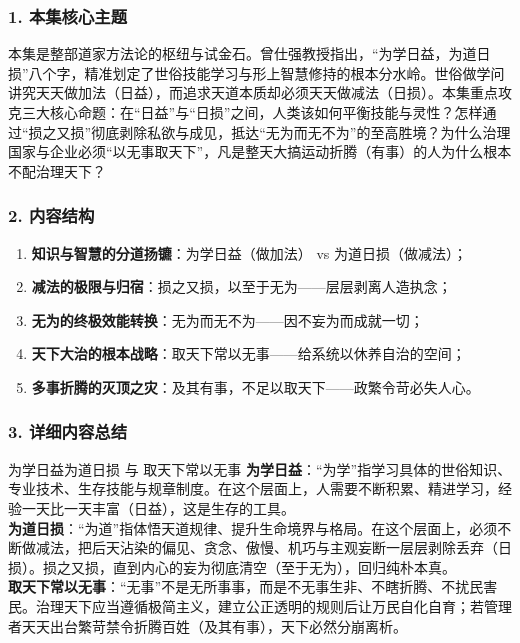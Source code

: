\subsubsection{1. 本集核心主题}
本集是整部道家方法论的枢纽与试金石。曾仕强教授指出，“为学日益，为道日损”八个字，精准划定了世俗技能学习与形上智慧修持的根本分水岭。世俗做学问讲究天天做加法（日益），而追求天道本质却必须天天做减法（日损）。本集重点攻克三大核心命题：在“日益”与“日损”之间，人类该如何平衡技能与灵性？怎样通过“损之又损”彻底剥除私欲与成见，抵达“无为而无不为”的至高胜境？为什么治理国家与企业必须“以无事取天下”，凡是整天大搞运动折腾（有事）的人为什么根本不配治理天下？

\subsubsection{2. 内容结构}
\begin{enumerate}
    \item \textbf{知识与智慧的分道扬镳}：为学日益（做加法） vs 为道日损（做减法）；
    \item \textbf{减法的极限与归宿}：损之又损，以至于无为——层层剥离人造执念；
    \item \textbf{无为的终极效能转换}：无为而无不为——因不妄为而成就一切；
    \item \textbf{天下大治的根本战略}：取天下常以无事——给系统以休养自治的空间；
    \item \textbf{多事折腾的灭顶之灾}：及其有事，不足以取天下——政繁令苛必失人心。
\end{enumerate}

\subsubsection{3. 详细内容总结}

\begin{ConceptBox}{为学日益为道日损 与 取天下常以无事}
\textbf{为学日益}：“为学”指学习具体的世俗知识、专业技术、生存技能与规章制度。在这个层面上，人需要不断积累、精进学习，经验一天比一天丰富（日益），这是生存的工具。\\
\textbf{为道日损}：“为道”指体悟天道规律、提升生命境界与格局。在这个层面上，必须不断做减法，把后天沾染的偏见、贪念、傲慢、机巧与主观妄断一层层剥除丢弃（日损）。损之又损，直到内心的妄为彻底清空（至于无为），回归纯朴本真。\\
\textbf{取天下常以无事}：“无事”不是无所事事，而是不无事生非、不瞎折腾、不扰民害民。治理天下应当遵循极简主义，建立公正透明的规则后让万民自化自育；若管理者天天出台繁苛禁令折腾百姓（及其有事），天下必然分崩离析。
\end{ConceptBox}

